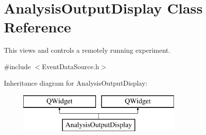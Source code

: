 \hypertarget{class_analysis_output_display}{\section{Analysis\-Output\-Display Class Reference}
\label{class_analysis_output_display}
}


This views and controls a remotely running experiment.  




{\ttfamily \#include $<$Event\-Data\-Source.\-h$>$}

Inheritance diagram for Analysis\-Output\-Display\-:\begin{figure}[H]
\begin{center}
\leavevmode
\includegraphics[height=2.000000cm]{class_analysis_output_display}
\end{center}
\end{figure}
